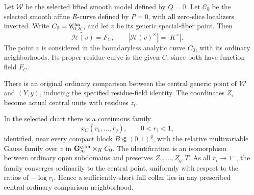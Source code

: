 Let \(\mathscr W\) be the selected lifted smooth model defined by
\(Q=0\).  Let \(\mathscr C_0\) be the selected smooth affine
\(R\)-curve defined by \(P=0\), with all zero-slice localizers
inverted.  Write \(C_0=\mathscr C_{0,K}^{\rm an}\), and let
\(v\) be its generic special-fiber point.  Then
\[
 \widetilde{\mathcal H(v)}=F_C,
 \qquad |\mathcal H(v)^\times|=|K^\times|.
 \tag{CC6}
\]
The point \(v\) is considered in the boundaryless analytic curve
\(C_0\), with its ordinary neighborhoods.  Its proper residue
curve is the given \(C\), since both have function field \(F_C\).

\begin{theorem}
\label{thm:r13-cc-ordinary-product}
There is an original ordinary comparison between the central
generic point of \(\mathscr W\) and \((Y,y)\), inducing the
specified residue-field identity.  The coordinates \(Z_i\) become
actual central units with residues \(z_i\).

In the selected chart there is a continuous family
\[
 x_C(r_1,\ldots,r_q),\qquad 0<r_i<1,
 \tag{CC7}
\]
identified, near every compact block
\(B\Subset(0,1)^q\), with the relative multivariable Gauss family
over \(v\) in \(\mathbf G_m^{q,\rm an}\times_K C_0\).
The identification is an isomorphism between ordinary open
subdomains and preserves \(Z_1,\ldots,Z_q,T\).
As all \(r_i\to1^-\), the family converges ordinarily to the
central point, uniformly with respect to the ratios of
\(-\log r_i\).  Hence a sufficiently short full collar lies
in any prescribed central ordinary comparison neighborhood.
\end{theorem}

